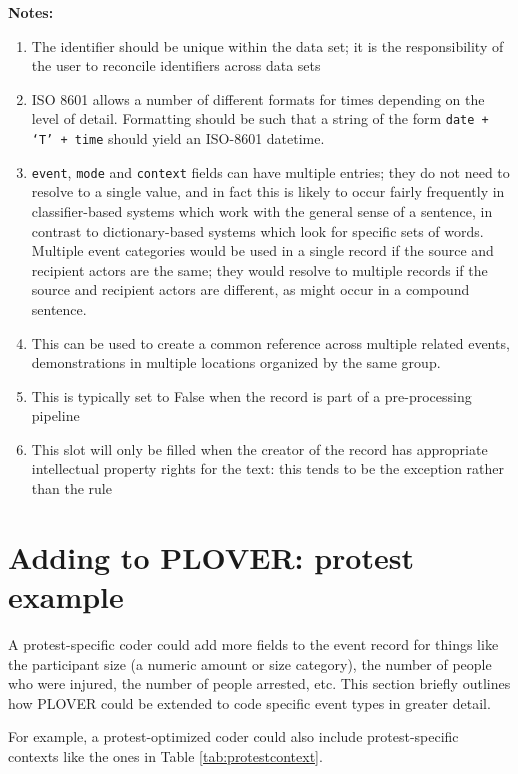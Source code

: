 \documentclass[11pt]{report}
\begin{document}
\noindent \textbf{Notes:}
\begin{enumerate}
\item The identifier should be unique within the data set; it is the responsibility of the user to reconcile identifiers across data sets
\item ISO 8601 allows a number of different formats for times depending on the level of detail. Formatting should be such that a string of the form \texttt{date + `T' + time} should yield an ISO-8601 datetime.
\item  \texttt{event}, \texttt{mode} and \texttt{context} fields can have multiple entries; they do not need to resolve to a single value, and in fact this is likely to occur fairly frequently in classifier-based systems which work with the general sense of a sentence, in contrast to dictionary-based systems which look for specific sets of words. Multiple event categories would be used in a single record if the source and recipient actors are the same; they would resolve to multiple records if the source and recipient actors are different, as might occur in a compound sentence.
\item  This can be used to create a common reference across multiple related events, demonstrations in multiple locations organized by the same group.
\item This is typically set to False when the record is part of a pre-processing pipeline
\item This slot will only be filled when the creator of the record has appropriate intellectual property rights for the text: this tends to be the exception rather than the rule
\end{enumerate}


\section{Adding to PLOVER: protest example}\label{sec:adding_to_plover}



A protest-specific coder could add more fields to the event record for things like the participant size (a numeric amount or size category), the number of people who were injured, the number of people arrested, etc. This section briefly outlines how PLOVER could be extended to code specific event types in greater detail.

For example, a protest-optimized coder could also include protest-specific contexts like the ones in Table \ref{tab:protestcontext}.
\end{document}
